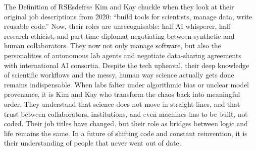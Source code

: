 \documentclass{eceasst}
\begin{document}
\begin{story}{The Definition of RSEs}{defrse}
Kim and Kay chuckle when they look at their original job descriptions from 2020: ``build tools for scientists, manage data, write reusable code.''
Now, their roles are unrecognisable: half AI whisperer, half research ethicist, and part-time diplomat negotiating between synthetic and human collaborators.
They now not only manage software, but also the personalities of autonomous lab agents and negotiate data-sharing agreements with international AI consortia.
Despite the tech upheaval, their deep knowledge of scientific workflows and the messy, human way science actually gets done remains indispensable.
When labs falter under algorithmic bias or unclear model provenance, it is Kim and Kay who transform the chaos back into meaningful order.
They understand that science does not move in straight lines, and that trust between collaborators, institutions, and even machines has to be built, not coded.
Their job titles have changed, but their role as bridges between logic and life remains the same.
In a future of shifting code and constant reinvention, it is their understanding of people that never went out of date.

\end{story}
\end{document}
